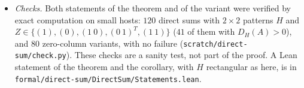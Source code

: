 \documentclass[11pt]{article}
\theoremstyle{plain}
\theoremstyle{definition}
\theoremstyle{remark}
\begin{document}
\begin{itemize}
\item \emph{Checks.} Both statements of the theorem and of the variant were verified by exact
computation on small hosts: $120$ direct sums with $2 \times 2$ patterns $H$ and
$Z \in \{(1), (0), (1\ 0), (0\ 1)^{T}, (1\ 1)\}$ ($41$ of them with $D_H(A) > 0$), and $80$
zero-column variants, with no failure (\texttt{scratch/direct-sum/check.py}). These checks are a
sanity test, not part of the proof. A Lean statement of the theorem and the corollary, with
$H$ rectangular as here, is in \texttt{formal/direct-sum/DirectSum/Statements.lean}.
\end{itemize}
\end{document}
